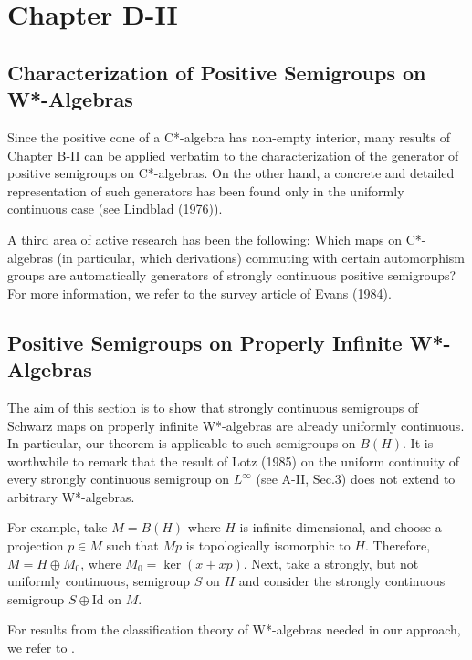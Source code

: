 \documentclass{article}
\begin{document}
\section*{Chapter D-II}

\subsection*{Characterization of Positive Semigroups on W*-Algebras}

Since the positive cone of a C*-algebra has non-empty interior, many results of Chapter B-II can be applied verbatim to the characterization of the generator of positive semigroups on C*-algebras. On the other hand, a concrete and detailed representation of such generators has been found only in the uniformly continuous case (see Lindblad (1976)).

A third area of active research has been the following: Which maps on C*-algebras (in particular, which derivations) commuting with certain automorphism groups are automatically generators of strongly continuous positive semigroups? For more information, we refer to the survey article of Evans (1984).

\subsection{Positive Semigroups on Properly Infinite W*-Algebras}
\label{subsec:d2-1.1}

The aim of this section is to show that strongly continuous semigroups of Schwarz maps on properly infinite W*-algebras are already uniformly continuous. In particular, our theorem is applicable to such semigroups on $B(H)$. It is worthwhile to remark that the result of Lotz (1985) on the uniform continuity of every strongly continuous semigroup on $L^{\infty}$ (see A-II, Sec.3) does not extend to arbitrary W*-algebras.

For example, take $M = B(H)$ where $H$ is infinite-dimensional, and choose a projection $p \in M$ such that $M p$ is topologically isomorphic to $H$. Therefore, $M = H \oplus M_0$, where $M_0 = \ker(x + x p)$. Next, take a strongly, but not uniformly continuous, semigroup $S$ on $H$ and consider the strongly continuous semigroup $S \oplus \text{Id}$ on $M$.

For results from the classification theory of W*-algebras needed in our approach, we refer to \cite{Sakai1971, Takesaki1979}.
\end{document}
